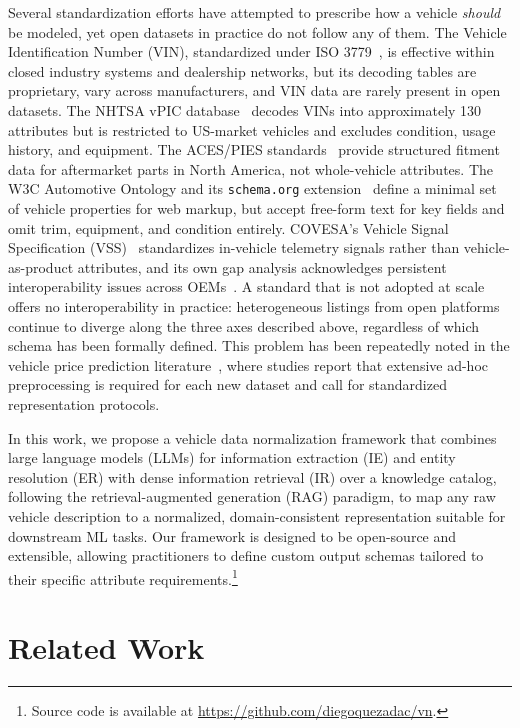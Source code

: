 \documentclass[conference]{IEEEtran}
\begin{document}
Several standardization efforts have attempted to prescribe how a vehicle \textit{should} be modeled, yet open datasets in practice do not follow any of them. The Vehicle Identification Number (VIN), standardized under ISO 3779~\cite{iso3779}, is effective within closed industry systems and dealership networks, but its decoding tables are proprietary, vary across manufacturers, and VIN data are rarely present in open datasets. The NHTSA vPIC database~\cite{NHTSAvPIC} decodes VINs into approximately 130 attributes but is restricted to US-market vehicles and excludes condition, usage history, and equipment. The ACES/PIES standards~\cite{AutoCareACES} provide structured fitment data for aftermarket parts in North America, not whole-vehicle attributes. The W3C Automotive Ontology and its \texttt{schema.org} extension~\cite{SchemaOrgAuto} define a minimal set of vehicle properties for web markup, but accept free-form text for key fields and omit trim, equipment, and condition entirely. COVESA's Vehicle Signal Specification (VSS)~\cite{COVESAVSS} standardizes in-vehicle telemetry signals rather than vehicle-as-product attributes, and its own gap analysis acknowledges persistent interoperability issues across OEMs~\cite{COVESAVDMReq}. A standard that is not adopted at scale offers no interoperability in practice: heterogeneous listings from open platforms continue to diverge along the three axes described above, regardless of which schema has been formally defined. This problem has been repeatedly noted in the vehicle price prediction literature~\cite{electronics12143083, vehicles7030094, 10825740}, where studies report that extensive ad-hoc preprocessing is required for each new dataset and call for standardized representation protocols.

In this work, we propose a vehicle data normalization framework that combines large language models (LLMs) for information extraction (IE) and entity resolution (ER) with dense information retrieval (IR) over a knowledge catalog, following the retrieval-augmented generation (RAG) paradigm, to map any raw vehicle description to a normalized, domain-consistent representation suitable for downstream ML tasks. Our framework is designed to be open-source and extensible, allowing practitioners to define custom output schemas tailored to their specific attribute requirements.\footnote{Source code is available at \url{https://github.com/diegoquezadac/vn}.}


\section{Related Work}
\end{document}
